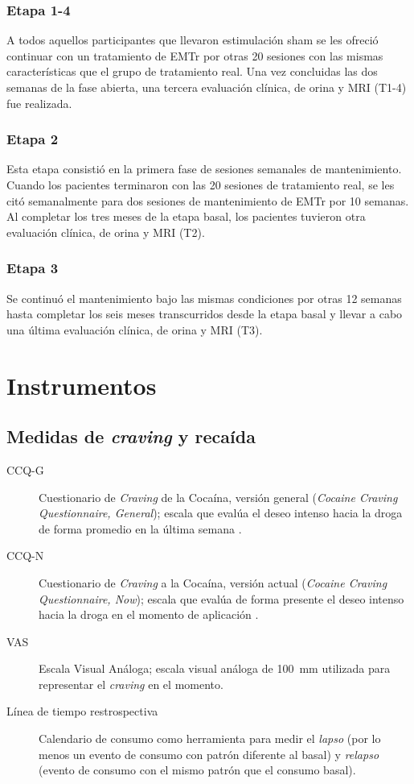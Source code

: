 \subsubsection{Etapa 1-4}
A todos aquellos participantes que llevaron estimulación sham se les ofreció continuar con un tratamiento de EMTr por otras 20 sesiones con las mismas características que el grupo de tratamiento real. Una vez concluidas las dos semanas de la fase abierta, una tercera evaluación clínica, de orina y MRI (T1-4) fue realizada.

\subsubsection{Etapa 2}
Esta etapa consistió en la primera fase de sesiones semanales de mantenimiento. Cuando los pacientes terminaron con las 20 sesiones de tratamiento real, se les citó semanalmente para dos sesiones de mantenimiento de EMTr por 10 semanas. Al completar los tres meses de la etapa basal, los pacientes tuvieron otra evaluación clínica, de orina y MRI (T2).

\subsubsection{Etapa 3}
Se continuó el mantenimiento bajo las mismas condiciones por otras 12 semanas hasta completar los seis meses transcurridos desde la etapa basal y llevar a cabo una última evaluación clínica, de orina y MRI (T3).

\section{Instrumentos}
\subsection{Medidas de \textit{craving} y recaída}
\begin{description}
    \item[CCQ-G] Cuestionario de \textit{Craving} de la Cocaína, versión general (\textit{Cocaine Craving Questionnaire, General}); escala que evalúa el deseo intenso hacia la droga de forma promedio en la última semana \parencite{Tiffany1993}.
    \item[CCQ-N] Cuestionario de \textit{Craving} a la Cocaína, versión actual (\textit{Cocaine Craving Questionnaire, Now}); escala que evalúa de forma presente el deseo intenso hacia la droga en el momento de aplicación \parencite{Tiffany1993}.
    \item[VAS] Escala Visual Análoga; escala visual análoga de \SI{100}{\milli\meter} utilizada para representar el \textit{craving} en el momento.
    \item[Línea de tiempo restrospectiva] Calendario de consumo como herramienta para medir el \emph{lapso} (por lo menos un evento de consumo con patrón diferente al basal) y \emph{relapso} (evento de consumo con el mismo patrón que el consumo basal).
\end{description}
